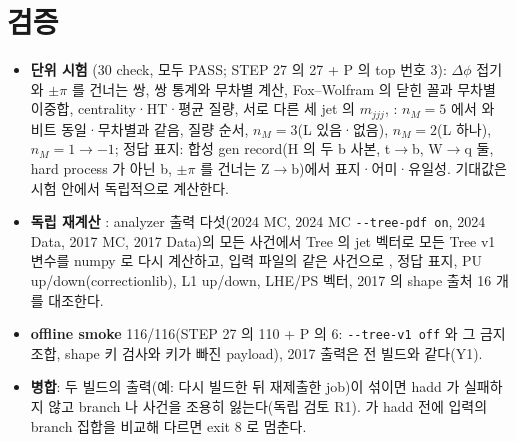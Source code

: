 \section{검증}\label{sec:reco-tests}
\begin{itemize}
\item \textbf{단위 시험} (30 check, 모두 PASS; STEP 27 의 27 + P 의 top 번호 3): $\Delta\phi$ 접기와 $\pm\pi$ 를 건너는 쌍, 쌍 통계와 무차별 계산, Fox–Wolfram 의 닫힌
      꼴과 무차별 이중합, centrality·HT·평균 질량, 서로 다른 세 jet 의 $m_{jjj}$, \chisq{}: $n_M=5$ 에서  와 비트 동일·무차별과 같음,
      질량 순서, $n_M=3$(L 있음·없음), $n_M=2$(L 하나), $n_M=1\to-1$; 정답 표지: 합성 gen record(H 의 두 b 사본, t$\to$b, W$\to$q 둘, hard process 가
      아닌 b, $\pm\pi$ 를 건너는 Z$\to$b)에서 표지·어미·유일성. 기대값은 시험 안에서 독립적으로 계산한다.
\item \textbf{독립 재계산} : analyzer 출력 다섯(2024 MC, 2024 MC \texttt{-{}-tree-pdf on}, 2024 Data, 2017 MC,
      2017 Data)의 모든 사건에서 Tree 의 jet 벡터로 모든 Tree v1 변수를 numpy 로 다시 계산하고, 입력 파일의 같은 사건으로 , 정답 표지,
      PU up/down(correctionlib), L1 up/down, LHE/PS 벡터, 2017 의 shape 출처 16 개를 대조한다.
\item \textbf{offline smoke} 116/116(STEP 27 의 110 + P 의 6: \texttt{-{}-tree-v1 off} 와 그 금지 조합, shape 키 검사와 키가 빠진 payload), 2017 출력은 전 빌드와 같다(Y1).
\item \textbf{병합}: 두 빌드의 출력(예: 다시 빌드한 뒤 재제출한 job)이 섞이면 hadd 가 실패하지 않고 branch 나 사건을 조용히 잃는다(독립 검토 R1).
       가 hadd 전에 입력의  branch 집합을 비교해 다르면 exit 8 로 멈춘다\tagtest{}.
\end{itemize}

